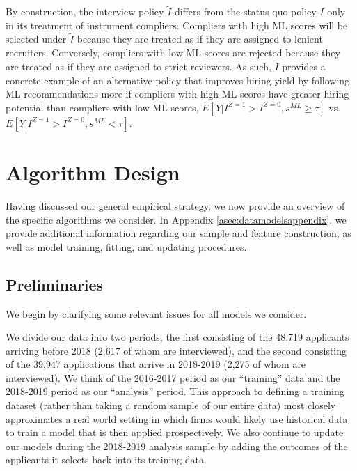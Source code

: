 \documentclass[crop,noquery,editorname,historyrev,nosurname,runningno,sepcount]{RESTUD}
\begin{document}
By construction, the interview policy $\tilde{I}$ differs from the status quo policy $I$ only in its treatment of instrument compliers.  Compliers with high ML scores will be selected under $\tilde{I}$ because they are treated as if they are assigned to lenient recruiters.  Conversely, compliers with low ML scores are rejected because they are treated as if they are assigned to strict reviewers.  As such, $\tilde{I}$ provides a concrete example of an alternative policy that improves hiring yield by following ML recommendations more if compliers with high ML scores have greater hiring potential than compliers with low ML scores, $E[Y| I^{Z=1} > I^{Z=0}, s^{ML} \geq \tau]$ vs. $E[Y| I^{Z=1} > I^{Z=0}, s^{ML} < \tau]$.  





\section{Algorithm Design} \label{sec:algoconstruction}

Having discussed our general empirical strategy, we now provide an overview of the specific algorithms we consider.  In Appendix \ref{asec:datamodelsappendix}, we provide additional information regarding our sample and feature construction, as well as model training, fitting, and updating procedures.

\subsection{Preliminaries}

We begin by clarifying some relevant issues for all models we consider.

We divide our data into two periods, the first consisting of the 48,719 applicants arriving before 2018 (2,617 of whom are interviewed), and the second consisting of the 39,947 applications that arrive in 2018-2019 (2,275 of whom are interviewed).  We think of the 2016-2017 period as our ``training'' data and the 2018-2019 period as our ``analysis'' period.  This approach to defining a training dataset (rather than taking a random sample of our entire data) most closely approximates a real world setting in which firms would likely use historical data to train a model that is then applied prospectively.  We also continue to update our models during the 2018-2019 analysis sample by adding the outcomes of the applicants it selects back into its training data.
 
\end{document}
